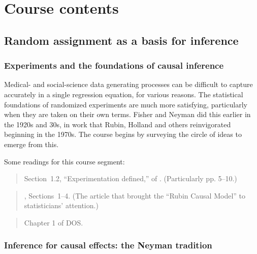 \documentclass[12pt]{article}
\begin{document}
\section{Course contents}

\subsection{Random assignment as a basis for inference}

\subsubsection{Experiments and the foundations of causal inference}

Medical- and social-science data generating processes can be difficult to
capture accurately in a single regression equation, for various reasons.  
The statistical foundations of randomized experiments are much more
satisfying, particularly when they are taken on their own
terms. Fisher and Neyman did this earlier in the 1920s and 30s, in
work that Rubin, Holland and others reinvigorated beginning in the
1970s.  The course begins by surveying the circle of ideas to emerge
from this. 


Some readings for this course segment:
\begin{verse} Section~1.2, ``Experimentation defined,''  of 
.  (Particularly pp. 5--10.) \end{verse}

\begin{verse}, Sections~1--4. (The article that brought the ``Rubin 
  Causal Model'' to  statisticians' attention.)\end{verse}

\begin{verse}
  Chapter 1 of DOS.
\end{verse}


\subsubsection{Inference for causal effects: the Neyman tradition}
\end{document}
